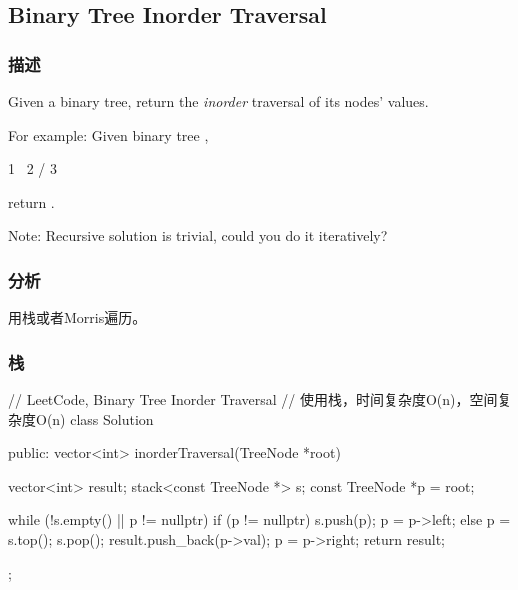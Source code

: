 \subsection{Binary Tree Inorder Traversal}
\label{sec:binary-tree-inorder-traversal}


\subsubsection{描述}
Given a binary tree, return the \emph{inorder} traversal of its nodes' values.

For example:
Given binary tree ,
\begin{Code}
 1
  \
   2
  /
 3
\end{Code}
return \code{[1,3,2]}.

Note: Recursive solution is trivial, could you do it iteratively?


\subsubsection{分析}
用栈或者Morris遍历。


\subsubsection{栈}
\begin{Code}
// LeetCode, Binary Tree Inorder Traversal
// 使用栈，时间复杂度O(n)，空间复杂度O(n)
class Solution {
public:
    vector<int> inorderTraversal(TreeNode *root) {
        vector<int> result;
        stack<const TreeNode *> s;
        const TreeNode *p = root;

        while (!s.empty() || p != nullptr) {
            if (p != nullptr) {
                s.push(p);
                p = p->left;
            } else {
                p = s.top();
                s.pop();
                result.push_back(p->val);
                p = p->right;
            }
        }
        return result;
    }
};
\end{Code}


